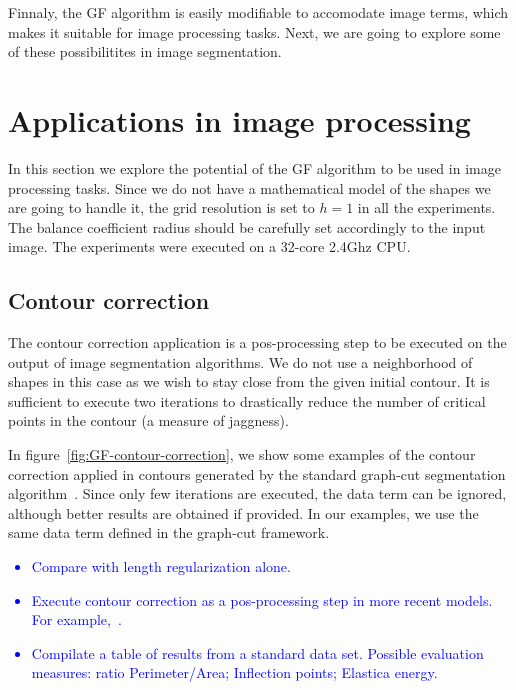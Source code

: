 \documentclass[smallextended]{svjour3}
\newcommand{\todo}[1]{{\textcolor{blue}{#1}}}
\begin{document}
Finnaly, the GF algorithm is easily modifiable to accomodate image terms, which makes it suitable for image processing tasks. Next, we are going to explore some of these possibilitites in image segmentation.

\section{Applications in image processing}


In this section we explore the potential of the GF algorithm to be used in image processing tasks. Since we do not have a mathematical model of the shapes we are going to handle it, the grid resolution is set to $h=1$ in all the experiments. The balance coefficient radius should be carefully set accordingly to the input image. The experiments were executed on a 32-core 2.4Ghz CPU.

\subsection{Contour correction}

The contour correction application is a pos-processing step to be executed on the output of image segmentation algorithms. We do not use a neighborhood of shapes in this case as we wish to stay close from the given initial contour. It is sufficient to execute two iterations to drastically reduce the number of critical points in the contour (a measure of jaggness).

In figure~\ref{fig:GF-contour-correction}, we show some examples of the contour correction applied in contours generated by the standard graph-cut segmentation algorithm~\cite{boykov01graphcut, rother04grabcut}. Since only few iterations are executed, the data term can be ignored, although better results are obtained if provided. In our examples, we use the same data term defined in the graph-cut framework.

\todo{
\begin{itemize}
\item{Compare with length regularization alone.}
\item{Execute contour correction as a pos-processing step in more recent models. For example,~\cite{kiefer2020Palms}.}
\item{Compilate a table of results from a standard data set. Possible evaluation measures: ratio Perimeter/Area; Inflection points; Elastica energy.}
\end{itemize}
}
\end{document}
